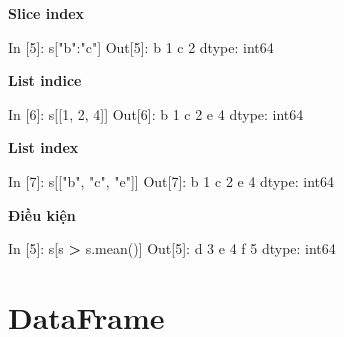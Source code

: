\documentclass[
]{book}
\newenvironment{Shaded}{\begin{snugshade}}{\end{snugshade}}
\newcommand{\DecValTok}[1]{\textcolor[rgb]{0.00,0.00,0.81}{#1}}
\newcommand{\NormalTok}[1]{#1}
\newcommand{\OperatorTok}[1]{\textcolor[rgb]{0.81,0.36,0.00}{\textbf{#1}}}
\newcommand{\StringTok}[1]{\textcolor[rgb]{0.31,0.60,0.02}{#1}}
\begin{document}
\textbf{Slice index}

\begin{Shaded}
\begin{Highlighting}[]
\NormalTok{In [}\DecValTok{5}\NormalTok{]: s[}\StringTok{"b"}\NormalTok{:}\StringTok{"c"}\NormalTok{]}
\NormalTok{Out[}\DecValTok{5}\NormalTok{]: }
\NormalTok{b    }\DecValTok{1}
\NormalTok{c    }\DecValTok{2}
\NormalTok{dtype: int64}
\end{Highlighting}
\end{Shaded}

\textbf{List indice}

\begin{Shaded}
\begin{Highlighting}[]
\NormalTok{In [}\DecValTok{6}\NormalTok{]: s[[}\DecValTok{1}\NormalTok{, }\DecValTok{2}\NormalTok{, }\DecValTok{4}\NormalTok{]]}
\NormalTok{Out[}\DecValTok{6}\NormalTok{]:}
\NormalTok{b    }\DecValTok{1}
\NormalTok{c    }\DecValTok{2}
\NormalTok{e    }\DecValTok{4}
\NormalTok{dtype: int64}
\end{Highlighting}
\end{Shaded}

\textbf{List index}

\begin{Shaded}
\begin{Highlighting}[]
\NormalTok{In [}\DecValTok{7}\NormalTok{]: s[[}\StringTok{"b"}\NormalTok{, }\StringTok{"c"}\NormalTok{, }\StringTok{"e"}\NormalTok{]]}
\NormalTok{Out[}\DecValTok{7}\NormalTok{]:}
\NormalTok{b    }\DecValTok{1}
\NormalTok{c    }\DecValTok{2}
\NormalTok{e    }\DecValTok{4}
\NormalTok{dtype: int64}
\end{Highlighting}
\end{Shaded}

\textbf{Điều kiện}

\begin{Shaded}
\begin{Highlighting}[]
\NormalTok{In [}\DecValTok{5}\NormalTok{]: s[s }\OperatorTok{\textgreater{}}\NormalTok{ s.mean()]}
\NormalTok{Out[}\DecValTok{5}\NormalTok{]:}
\NormalTok{d    }\DecValTok{3}
\NormalTok{e    }\DecValTok{4}
\NormalTok{f    }\DecValTok{5}
\NormalTok{dtype: int64}
\end{Highlighting}
\end{Shaded}

\hypertarget{dataframe}{%
\section{DataFrame}\label{dataframe}}
\end{document}
